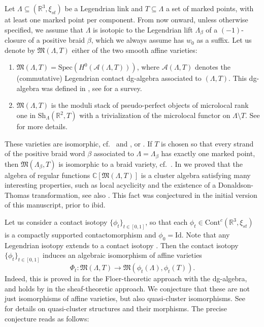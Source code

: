\documentclass[10pt]{amsart}
\theoremstyle{plain}
\theoremstyle{definition}
\theoremstyle{remark}
\numberwithin{equation}{section}
\newcommand{\R}{\mathbb{R}}
\newcommand{\C}{\mathbb{C}}
\newcommand{\SA}{\mathcal{A}}
\newcommand{\La}{\Lambda}
\newcommand{\sse}{\subseteq}
\newcommand{\lr}{\longrightarrow}
\renewcommand{\C}{\mathbb{C}}
\newcommand{\MG}[1]{{\color{teal}{{\bf Misha}: #1}}}
\begin{document}
\noindent Let $\La\sse(\R^3,\xi_{st})$ be a Legendrian link and $T\sse\La$ a set of marked points, with at least one marked point per component. From now onward, unless otherwise specified, we assume that $\La$ is isotopic to the Legendrian lift $\La_\beta$ of a $(-1)$-closure of a positive braid $\beta$, which we always assume has $w_0$ as a suffix. Let us denote by $\mathfrak{M}(\La,T)$ either of the two smooth affine varieties:%

\begin{enumerate}
    \item $\mathfrak{M}(\La,T)=\mbox{Spec}(H^0(\SA(\La,T)))$, where $\SA(\La,T)$ denotes the (commutative) Legendrian contact dg-algebra associated to $(\La,T)$. This dg-algebra was defined in \cite{Chekanov}, see \cite{EtnyreNg18} for a survey.\\

  \item $\mathfrak{M}(\La,T)$ is the moduli stack of pseudo-perfect objects of microlocal rank one in $\mbox{Sh}_\La(\R^2,T)$ with a trivialization of the microlocal functor on $\La\setminus T$. See \cite[Section 2.7]{CasalsWeng22} for more details.
\end{enumerate}

\noindent These varieties are isomorphic, cf.~\cite[Section 4]{CasalsWeng22} and \cite[Prop.~5.2]{CasalsNg}, or \cite{NRSSZ}. If $T$ is chosen so that every strand of the positive braid word $\beta$ associated to $\La=\La_\beta$ has exactly one marked point, then $\mathfrak{M}(\La_\beta,T)$ is isomorphic to 
a 
braid variety, 
cf.~\cite[Section 2]{CGGS}. %
In \cite{cgglss} we proved that the algebra of regular functions $\C[\mathfrak{M}(\La,T)]$ is a cluster algebra satisfying many interesting properties, such as local acyclicity and the existence of a Donaldson-Thomas transformation, see also \cite{CasalsWeng22,glsbs}. This fact was conjectured in the initial version of this manuscript, prior to ibid.

Let us consider a contact isotopy $\{\phi_t\}_{t\in[0,1]}$, so that each $\phi_t\in\mbox{Cont}^c(\R^3,\xi_{st})$ is a compactly supported contactomorphism and $\phi_0=\mbox{Id}$. Note that any Legendrian isotopy extends to a contact isotopy \cite{Geiges08}. Then the contact isotopy $\{\phi_t\}_{t\in[0,1]}$ induces an algebraic isomorphism of affine varieties
$$\Phi_t:\mathfrak{M}(\La,T)\lr\mathfrak{M}(\phi_t(\La),\phi_t(T)).$$
Indeed, this is proved in \cite{Chekanov} for the Floer-theoretic approach with the dg-algebra, %
and holds by \cite{GKS_Quantization} in the sheaf-theoretic approach. We conjecture that these are not just isomorphisms of affine varieties, but also quasi-cluster isomorphisms. See ~\cite{Fraser} for details on quasi-cluster structures and their morphisms. The precise conjecture reads as follows:%
\end{document}
